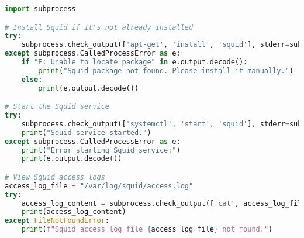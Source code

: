 \documentclass{VUMIFPSmagistrinis}
\begin{document}
\begin{lstlisting}[language=Python]
import subprocess

# Install Squid if it's not already installed
try:
    subprocess.check_output(['apt-get', 'install', 'squid'], stderr=subprocess.STDOUT)
except subprocess.CalledProcessError as e:
    if "E: Unable to locate package" in e.output.decode():
        print("Squid package not found. Please install it manually.")
    else:
        print(e.output.decode())

# Start the Squid service
try:
    subprocess.check_output(['systemctl', 'start', 'squid'], stderr=subprocess.STDOUT)
    print("Squid service started.")
except subprocess.CalledProcessError as e:
    print("Error starting Squid service:")
    print(e.output.decode())

# View Squid access logs
access_log_file = "/var/log/squid/access.log"
try:
    access_log_content = subprocess.check_output(['cat', access_log_file], universal_newlines=True)
    print(access_log_content)
except FileNotFoundError:
    print(f"Squid access log file {access_log_file} not found.")
\end{lstlisting}


	

	






		
\pagebreak
\printbibliography[heading=bibintoc] 
\end{document}

